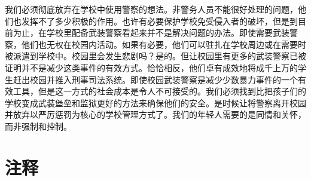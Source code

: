 \documentclass[fontset=fandol, a4paper, 12pt, openright]{ctexbook}
\begin{document}
我们必须彻底放弃在学校中使用警察的想法。非警务人员不能很好处理的问题，他们也发挥不了多少积极的作用。也许有必要保护学校免受侵入者的破坏，但是到目前为止，在学校里配备武装警察看起来并不是解决问题的办法。即使需要武装警察，他们也无权在校园内活动。如果有必要，他们可以驻扎在学校周边或在需要时被派遣到学校中。校园里会发生悲剧吗？是的。但让校园里有更多的武装警察已被证明并不是减少这类事件的有效方式。恰恰相反，他们卓有成效地将成千上万的学生赶出校园并推入刑事司法系统。即使校园武装警察是减少少数暴力事件的一个有效工具，但是这一方式的社会成本是令人不可接受的。我们必须找到比把孩子们的学校变成武装堡垒和监狱更好的方法来确保他们的安全。是时候让将警察离开校园并放弃以严厉惩罚为核心的学校管理方式了。我们的年轻人需要的是同情和关怀，而非强制和控制。

\section*{注释}
\end{document}
